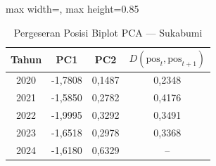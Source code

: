 \begin{table}[H]
\centering
\caption{Pergeseran Posisi Biplot PCA --- Sukabumi} \label{tab:appjarak_pca_skor_sukabumi}
\begin{adjustbox}{max width=\textwidth, max height=0.85\textheight}
\begin{tabular}{|c|c|c|c|}
\hline
\textbf{Tahun} & \textbf{PC1} & \textbf{PC2} & \textbf{$D(\text{pos}_t, \text{pos}_{t+1})$} \\
\hline
2020 & -1,7808 & 0,1487 & 0,2348 \\
2021 & -1,5850 & 0,2782 & 0,4176 \\
2022 & -1,9995 & 0,3292 & 0,3491 \\
2023 & -1,6518 & 0,2978 & 0,3368 \\
2024 & -1,6180 & 0,6329 & -- \\
\hline
\end{tabular}
\end{adjustbox}
\end{table}